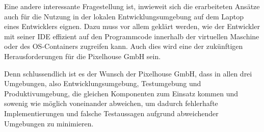 Eine andere interessante Fragestellung ist, inwieweit sich die erarbeiteten Ansätze auch für die Nutzung in der lokalen Entwicklungsumgebung auf dem Laptop eines Entwicklers eignen. Dazu muss vor allem geklärt werden, wie der Entwickler mit seiner IDE effizient auf den Programmcode innerhalb der virtuellen Maschine oder des OS-Containers zugreifen kann. Auch dies wird eine der zukünftigen Herausforderungen für die Pixelhouse GmbH sein.

Denn schlussendlich ist es der Wunsch der Pixelhouse GmbH, dass in allen drei Umgebungen, also Entwicklungsumgebung, Testumgebung und Produktivumgebung, die gleichen Komponenten zum Einsatz kommen und sowenig wie möglich voneinander abweichen, um dadurch fehlerhafte Implementierungen und falsche Testaussagen aufgrund abweichender Umgebungen zu minimieren.